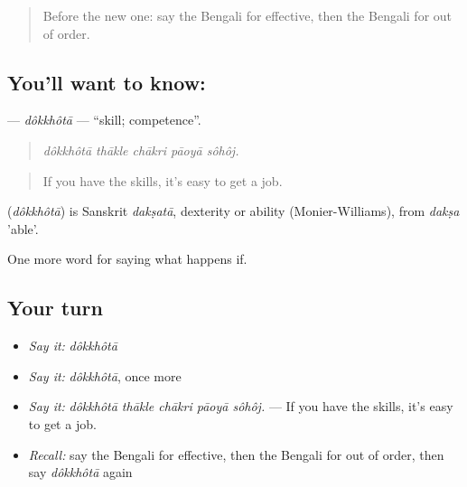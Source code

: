 \label{lesson:BN-C381-dokkhota}



\begin{quote}
Before the new one: say the Bengali for effective, then the Bengali for out of order.
\end{quote}

\subsection*{You'll want to know: }
\textbf{} — \emph{dôkkhôtā} — \textquotedblleft{}skill; competence\textquotedblright{}.

\begin{quote}
    
\end{quote}

\begin{quote}
\emph{dôkkhôtā thākle chākri pāoyā sôhôj.}
\end{quote}

\begin{quote}
If you have the skills, it's easy to get a job.
\end{quote}

\begin{cousinweb}
\textbf{} (\emph{dôkkhôtā}) is Sanskrit \emph{dakṣatā}, dexterity or ability (Monier-Williams), from \emph{dakṣa} 'able'.
\end{cousinweb}

\begin{grammarlens}[title={What you've built}]
One more word for saying what happens if.
\end{grammarlens}

\subsection*{Your turn}
\begin{itemize}
\raggedright
  \item \emph{Say it:} \emph{dôkkhôtā}
  \item \emph{Say it:} \emph{dôkkhôtā}, once more
  \item \emph{Say it:} \emph{dôkkhôtā thākle chākri pāoyā sôhôj.} — If you have the skills, it's easy to get a job.
  \item \emph{Recall:} say the Bengali for effective, then the Bengali for out of order, then say \emph{dôkkhôtā} again
\end{itemize}

